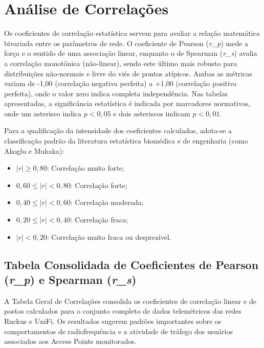 \section{Análise de Correlações}

Os coeficientes de correlação estatística servem para avaliar a relação matemática bivariada entre os parâmetros de rede. O coeficiente de Pearson (\textit{r\_p}) mede a força e o sentido de uma associação linear, enquanto o de Spearman (\textit{r\_s}) avalia a correlação monotônica (não-linear), sendo este último mais robusto para distribuições não-normais e livre do viés de pontos atípicos. Ambas as métricas variam de -1,00 (correlação negativa perfeita) a +1,00 (correlação positiva perfeita), onde o valor zero indica completa independência. Nas tabelas apresentadas, a significância estatística é indicada por marcadores normativos, onde um asterisco indica $p < 0,05$ e dois asteriscos indicam $p < 0,01$.

Para a qualificação da intensidade dos coeficientes calculados, adota-se a classificação padrão da literatura estatística biomédica e de engenharia (como Akoglu e Mukaka):
\begin{itemize}
  \item $|r| \ge 0,80$: Correlação muito forte;
  \item $0,60 \le |r| < 0,80$: Correlação forte;
  \item $0,40 \le |r| < 0,60$: Correlação moderada;
  \item $0,20 \le |r| < 0,40$: Correlação fraca;
  \item $|r| < 0,20$: Correlação muito fraca ou desprezível.

\end{itemize}
\subsection{Tabela Consolidada de Coeficientes de Pearson (\textit{r\_p}) e Spearman (\textit{r\_s})}

A Tabela Geral de Correlações consolida os coeficientes de correlação linear e de postos calculados para o conjunto completo de dados telemétricos das redes Ruckus e UniFi. Os resultados sugerem padrões importantes sobre os comportamentos de radiofrequência e a atividade de tráfego dos usuários associados aos Access Points monitorados.

